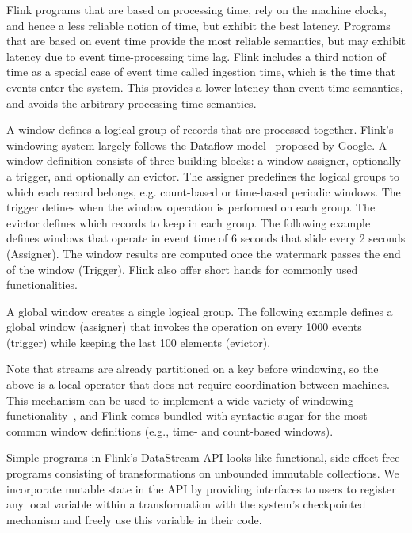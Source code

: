 Flink programs that are based on processing time, rely on the machine clocks, and hence a less reliable notion of time, but exhibit the best latency. Programs that are based on event time provide the most reliable semantics, but may exhibit latency due to event time-processing time lag. Flink includes a third notion of time as a special case of event time called ingestion time, which is the time that events enter the system. This provides  a lower latency than event-time semantics, and avoids the arbitrary processing time semantics.

 A window defines a logical group of records that are processed together. Flink's windowing system largely follows the Dataflow model~\cite{akidau2015dataflow} proposed by Google. A window definition consists of three building blocks: a window assigner, optionally a trigger, and optionally an evictor. 
The assigner predefines the logical groups to which each record belongs, e.g. count-based or time-based periodic windows. The trigger defines when the window operation is performed on each group. The evictor defines which records to keep in each group. The following example defines windows that operate in event time of 6 seconds that slide every 2 seconds (Assigner). The window results are computed once the watermark passes the end of the window (Trigger). Flink also offer short hands for commonly used functionalities.



A global window creates a single logical group. The following example defines a global window (assigner) that invokes the operation on every 1000 events (trigger) while keeping the last 100 elements (evictor). 



Note that streams are already partitioned on a key before windowing, so the above is a local operator that does not require coordination between machines. This mechanism can be used to implement a wide variety of windowing functionality~\cite{akidau2015dataflow}, and Flink comes bundled with syntactic sugar for the most common window definitions (e.g., time- and count-based windows). 

Simple programs in Flink's DataStream API looks like functional, side effect-free programs consisting of transformations on unbounded immutable collections. We incorporate mutable state in the API by providing interfaces to users to register any local variable within a transformation with the system's checkpointed mechanism and freely use this variable in their code. 

